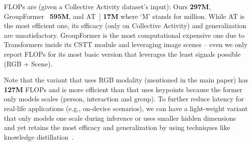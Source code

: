 \documentclass[runningheads]{llncs}
\begin{document}
FLOPs are (given a Collective Activity dataset's input):
Ours \textbf{ 297M}, 
GroupFormer~\cite{GroupFormer} \textbf{595M}, and
AT~\cite{actor-transformer}]  \textbf{17M} where `M' stands for million. 
While AT is the most efficient one, its efficacy (only  on Collective Activity) and generalization are unsatisfactory. 
GroupFormer is the most
computational 
expensive one 
due to  Transformers  
inside its CSTT module and leveraging image scenes -- 
even we only report FLOPs for its most basic version that leverages the least signals possible (RGB + Scene). 

Note that the  \ours variant that uses RGB modality (mentioned in the main paper) has \textbf{127M} FLOPs and is more efficient than \ours that uses keypoints because the former only models  scales (person, interaction and group).
To further reduce latency for real-life applications (e.g., on-device scenarios),
we can have a light-weight \ours variant that only models one scale during inference  or uses smaller hidden dimensions  and yet retains the most efficacy and generalization by using techniques like knowledge distillation~\cite{hinton2015distilling}. 
 
 
 
\end{document}
